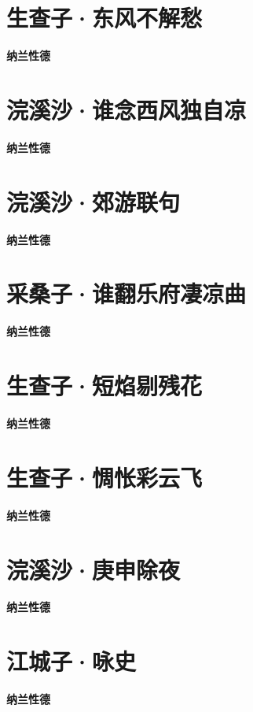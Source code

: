 \documentclass[12pt,a4paper]{ctexbook}
\begin{document}
\section{生查子·东风不解愁}
\textbf{纳兰性德}\par\vspace{0.5em}

\section{浣溪沙·谁念西风独自凉}
\textbf{纳兰性德}\par\vspace{0.5em}

\section{浣溪沙·郊游联句}
\textbf{纳兰性德}\par\vspace{0.5em}

\section{采桑子·谁翻乐府凄凉曲}
\textbf{纳兰性德}\par\vspace{0.5em}

\section{生查子·短焰剔残花}
\textbf{纳兰性德}\par\vspace{0.5em}

\section{生查子·惆怅彩云飞}
\textbf{纳兰性德}\par\vspace{0.5em}

\section{浣溪沙·庚申除夜}
\textbf{纳兰性德}\par\vspace{0.5em}

\section{江城子·咏史}
\textbf{纳兰性德}\par\vspace{0.5em}
\end{document}
